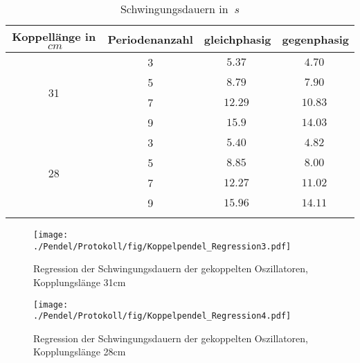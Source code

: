 \begin{table}[H]
    \begin{center}
        \caption{Schwingungsdauern in $\SI{}{s}$}
        \begin{tabular}{cccc}
            \hline
            Koppellänge in $\SI{}{cm}$ & Periodenanzahl & gleichphasig   & gegenphasig    \\
            \hline
            \multirow{4}{*}{31}        & 3              & $\SI{5,37}{}$  & $\SI{4,70}{}$  \\
                                       & 5              & $\SI{8,79}{}$  & $\SI{7,90}{}$  \\
                                       & 7              & $\SI{12,29}{}$ & $\SI{10,83}{}$ \\
                                       & 9              & $\SI{15,9}{}$ & $\SI{14,03}{}$ \\
            \hline
            \multirow{4}{*}{28}        & 3              & $\SI{5,40}{}$  & $\SI{4,82}{}$  \\
                                       & 5              & $\SI{8,85}{}$  & $\SI{8,00}{}$  \\
                                       & 7              & $\SI{12,27}{}$ & $\SI{11,02}{}$ \\
                                       & 9              & $\SI{15,96}{}$ & $\SI{14,11}{}$ \\
            \hline
            \label{tab:Koppellaenge-Messwerte}
        \end{tabular}
    \end{center}
\end{table}

\begin{figure}[tb]{}
    \begin{center}
        \texttt{[image: ./Pendel/Protokoll/fig/Koppelpendel\_Regression3.pdf]}
        \caption{Regression der Schwingungsdauern der gekoppelten Oszillatoren,  Kopplungslänge 31cm}
        \label{fig:Schwingungsdauern-gekoppelte-Oszillatoren1}
    \end{center}
\end{figure}

\begin{figure}[tb]{}
    \begin{center}
        \texttt{[image: ./Pendel/Protokoll/fig/Koppelpendel\_Regression4.pdf]}
        \caption{Regression der Schwingungsdauern der gekoppelten Oszillatoren, Kopplungslänge 28cm}
        \label{fig:Schwingungsdauern-gekoppelte-Oszillatoren2}
    \end{center}
\end{figure}

